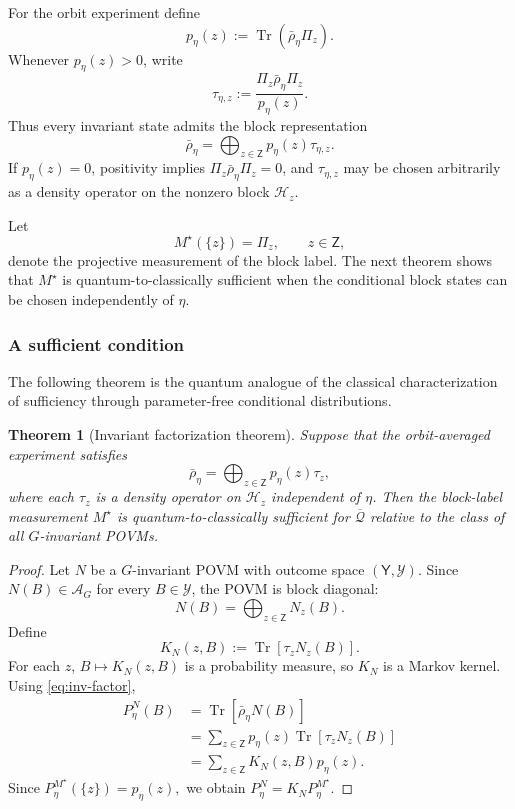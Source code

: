 \documentclass{article}
\newtheorem{theorem}{Theorem}[section]
\theoremstyle{named}
\theoremstyle{named1}
\newcommand{\Tr}{\operatorname{Tr}}
\newcommand{\cQ}{\mathcal Q}
\newcommand{\cA}{\mathcal A}
\newcommand{\cH}{\mathcal H}
\theoremstyle{plain}
\theoremstyle{remark}
\begin{document}
For the orbit experiment define
\[
    p_\eta(z)
    :=
    \Tr(\bar\rho_\eta\Pi_z).
\]
Whenever $p_\eta(z)>0$, write
\[
    \tau_{\eta,z}
    :=
    \frac{\Pi_z\bar\rho_\eta\Pi_z}{p_\eta(z)}.
\]
Thus every invariant state admits the block representation
\[
    \bar\rho_\eta
    =
    \bigoplus_{z\in\mathsf Z}
    p_\eta(z)\tau_{\eta,z}.
\]
If $p_\eta(z)=0$, positivity implies
$\Pi_z\bar\rho_\eta\Pi_z=0$, and $\tau_{\eta,z}$ may be chosen
arbitrarily as a density operator on the nonzero block
$\mathcal H_z$.  

Let
\[
    M^\star(\{z\})=\Pi_z,
    \qquad
    z\in\mathsf Z,
\]
denote the projective measurement of the block label. The next theorem shows that $M^\star$ is quantum-to-classically
sufficient when the conditional block states can be chosen
independently of $\eta$.

\subsubsection{A sufficient condition}

The following theorem is the quantum analogue of the classical characterization
of sufficiency through parameter-free conditional distributions.

\begin{theorem}[Invariant factorization theorem]
\label{thm:invariant-factorization}
Suppose that the orbit-averaged experiment satisfies
\begin{equation}
    \bar\rho_\eta
    =
    \bigoplus_{z\in\mathsf Z}
    p_\eta(z)\tau_z,
    \label{eq:inv-factor}
\end{equation}
where each $\tau_z$ is a density operator on $\cH_z$ independent of $\eta$.
Then the block-label measurement $M^\star$ is quantum-to-classically sufficient
for $\overline{\cQ}$ relative to the class of all $G$-invariant POVMs.
\end{theorem}

\begin{proof}
Let $N$ be a $G$-invariant POVM with outcome space
$(\mathsf Y,\mathcal Y)$. Since $N(B)\in\cA_G$ for every $B\in\mathcal Y$, the POVM is
block diagonal:
\[
    N(B)
    =
    \bigoplus_{z\in\mathsf Z}N_z(B).
\]
Define
\[
    K_N(z,B)
    :=
    \Tr[\tau_zN_z(B)].
\]
For each $z$, $B\mapsto K_N(z,B)$ is a probability measure, so $K_N$ is a
Markov kernel. Using \eqref{eq:inv-factor},
\[
\begin{aligned}
    P_\eta^N(B)
    &=
    \Tr[\bar\rho_\eta N(B)]\\
    &=
    \sum_{z\in\mathsf Z}
    p_\eta(z)\Tr[\tau_zN_z(B)]\\
    &=
    \sum_{z\in\mathsf Z}
    K_N(z,B)p_\eta(z).
\end{aligned}
\]
Since
\(
    P_\eta^{M^\star}(\{z\})
    =
    p_\eta(z),
\)
we obtain
\(
    P_\eta^N
    =
    K_NP_\eta^{M^\star}.
\)
\end{proof}
\end{document}
